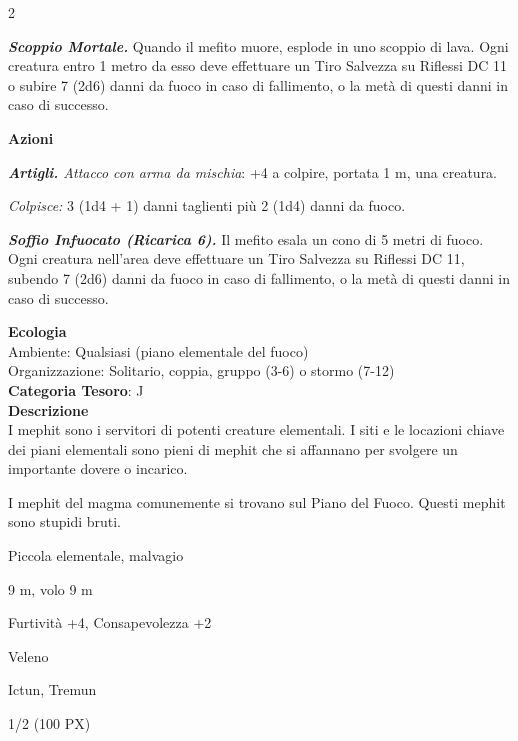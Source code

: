 \begin{multicols}{2}
{\emph{\textbf{Scoppio Mortale.}} Quando il mefito muore, esplode in uno scoppio di lava. Ogni creatura entro 1 metro da esso deve effettuare un Tiro Salvezza su Riflessi DC 11 o subire 7 (2d6) danni da fuoco in caso di fallimento, o la metà di questi danni in caso di successo.

\textbf{Azioni}

\emph{\textbf{Artigli.} Attacco con arma da mischia}: +4 a colpire, portata 1 m, una creatura.

\emph{Colpisce:} 3 (1d4 + 1) danni taglienti più 2 (1d4) danni da fuoco.

\emph{\textbf{Soffio Infuocato (Ricarica 6).}} Il mefito esala un cono di 5 metri di fuoco. Ogni creatura nell'area deve effettuare un Tiro Salvezza su Riflessi DC 11, subendo 7 (2d6) danni da fuoco in caso di fallimento, o la metà di questi danni in caso di successo.

\textbf{Ecologia}\\
Ambiente: Qualsiasi (piano elementale del fuoco)\\
Organizzazione: Solitario, coppia, gruppo (3-6) o stormo (7-12)\\
\textbf{Categoria Tesoro}: J\\
\textbf{Descrizione}\\
I mephit sono i servitori di potenti creature elementali. I siti e le locazioni chiave dei piani elementali sono pieni di mephit che si affannano per svolgere un importante dovere o incarico.

I mephit del magma comunemente si trovano sul Piano del Fuoco. Questi mephit sono stupidi bruti.

\begin{description}[noitemsep, topsep=0pt, parsep=0pt, partopsep=0pt, itemsep=1pt, leftmargin=2.35cm,  labelwidth=2.2cm, itemindent=0cm, listparindent=0pt] %
\setlength{\baselineskip}{10pt}
\item[\textbf{Taglia/Tipo}] Piccola elementale, malvagio
\item[\textbf{Caratt.}] 
\item[\textbf{Punti Ferita}] 
\item[\textbf{Movimento}] 9 m, volo 9 m
\item[\textbf{Tiri Salvez.}] 
\item[\textbf{Comp.}] Furtività +4, Consapevolezza +2
\item[\textbf{Imm. Danni}] Veleno
\item[\textbf{Sensi}] 
\item[\textbf{Linguaggi}] Ictun, Tremun
\item[\textbf{Sfida}] 1/2 (100 PX)
\end{description}
\smallskip

}
\end{multicols}
